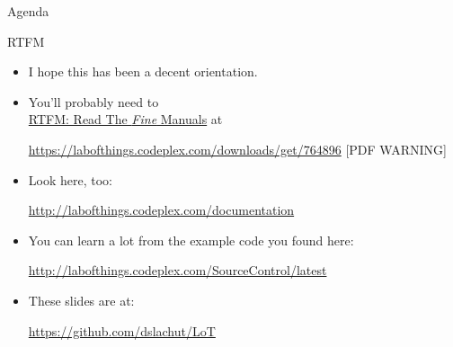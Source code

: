\documentclass[11pt]{beamer}
\begin{document}
\begin{frame}{Agenda}
\tableofcontents
\end{frame}

\begin{frame}{RTFM}
    \begin{itemize}
        \item I hope this has been a decent orientation.
        \item You'll probably need to \\
        
        \href{https://labofthings.codeplex.com/downloads/get/764896}{\large RTFM: Read The \textit{Fine} Manuals} at
        
        {\small\url{https://labofthings.codeplex.com/downloads/get/764896} [PDF WARNING]}
        
        \item Look here, too:
        
        {\small\url{http://labofthings.codeplex.com/documentation}}
        
        \item You can learn a lot from the example code you found here:
        
        {\small\url{http://labofthings.codeplex.com/SourceControl/latest}}
        
        \item These slides are at:
        
        {\small\url{https://github.com/dslachut/LoT}}
        
    \end{itemize}
\end{frame}
\end{document}
